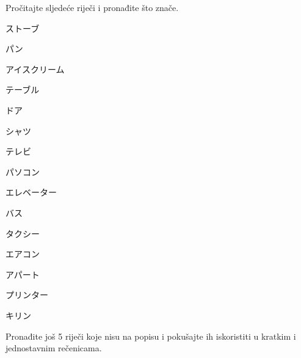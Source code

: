 
\author{Tomislav Mamić}

	
	\begin{mondai}{Pročitajte sljedeće riječi i pronađite što znače.}
		\item ストーブ
		\item パン
		\item アイスクリーム
		\item テーブル
		\item ドア
		\item シャツ
		\item テレビ
		\item パソコン
		\item エレベーター
		\item バス
		\item タクシー
		\item エアコン
		\item アパート
		\item プリンター
		\item キリン
	\end{mondai}

	Pronađite još 5 riječi koje nisu na popisu i pokušajte ih iskoristiti u kratkim i jednostavnim rečenicama.

